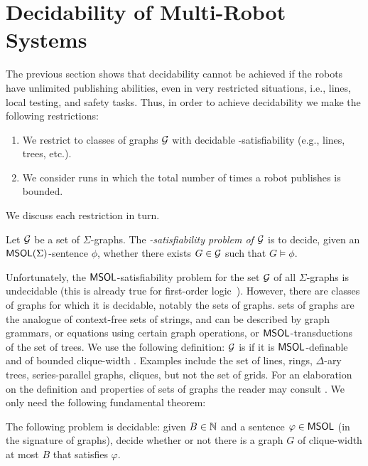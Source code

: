 
\section{Decidability of Multi-Robot Systems} \label{sec:dec}
The previous section shows that decidability cannot be achieved if the robots have unlimited publishing abilities, even in very restricted situations, i.e., lines, local testing, and safety tasks. Thus, in order to achieve decidability we make the following restrictions:
\begin{enumerate}
 \item We restrict to classes of graphs $\mathcal{G}$ with decidable \msol-satisfiability (e.g., lines, trees, etc.).

 \item We consider runs in which the total number of times a robot publishes is bounded. 
\end{enumerate}

We discuss each restriction in turn. 

\begin{definition} 
 Let $\mathcal{G}$ be a set of $\Sigma$-graphs. The {\em \msol-satisfiability problem of $\mathcal{G}$} is to decide, given an $\mathsf{MSOL}(\Sigma)$-sentence $\phi$, whether there exists $G \in \mathcal{G}$ such that $G \models \phi$. 
\end{definition}

Unfortunately, the $\mathsf{MSOL}$-satisfiability problem for the set $\mathcal{G}$ of all $\Sigma$-graphs is undecidable (this is already true for first-order logic~\cite{EbFl95}). However, there are classes of graphs for which it is decidable, notably the \courcellian sets of graphs.  
\courcellian sets of graphs are the analogue of context-free sets of strings, and can be described by graph grammars, or equations using certain graph operations, or $\mathsf{MSOL}$-transductions of the set of trees. We use the following definition: $\mathcal{G}$ is {\em \courcellian} if it is $\mathsf{MSOL}$-definable and of bounded clique-width \cite{CE12}. Examples include the set of lines, rings, $\Delta$-ary trees, series-parallel graphs, cliques, but not the set of  grids. 
For an elaboration on the definition and properties of \courcellian sets of graphs the reader may consult \cite{CE12}. We only need the following fundamental theorem:


\begin{theorem} \label{thm:courcelle}
The following problem is decidable: given $B \in \mathbb{N}$ and a sentence $\varphi \in \mathsf{MSOL}$ (in the signature of graphs), decide 
whether or not there is a graph $G$ of clique-width at most $B$ that satisfies $\varphi$.
\end{theorem}

